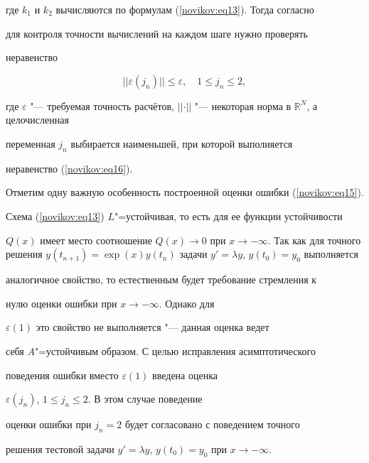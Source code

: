 где $k_1$ и $k_2$ вычисляются по формулам (\ref{novikov:eq13}). Тогда согласно \cite{Novikov:NovNov}

для контроля точности вычислений на каждом шаге нужно проверять

неравенство

\begin{equation}

\label{novikov:eq16}

\vert \vert \varepsilon(j_n)\vert \vert \leq \varepsilon,\quad 1\leq j_n \leq 2,

\end{equation}

где $\varepsilon $ "--- требуемая точность расчётов, $\vert \vert

\cdot \vert \vert $ "--- некоторая норма в $\mathbb{R}^N$, а целочисленная

переменная $j_n$ выбирается наименьшей, при которой выполняется

неравенство (\ref{novikov:eq16}).



Отметим одну важную особенность построенной оценки ошибки (\ref{novikov:eq15}).

Схема (\ref{novikov:eq13}) $L$"=устойчивая, то есть для ее функции устойчивости

$Q(x)$ имеет место соотношение $Q(x) \rightarrow 0$ при $x

\rightarrow - \infty $. Так как для точного решения $y(t_{n

+1})=\exp(x)y(t_n)$ задачи $y'=\lambda y$, $y(t_0)=y_0$ выполняется

аналогичное свойство, то естественным будет требование стремления к

нулю оценки ошибки при $x \rightarrow -\infty $. Однако для

$\varepsilon(1)$ это свойство не выполняется "--- данная оценка ведет

себя $A$"=устойчивым образом. С целью исправления асимптотического

поведения ошибки вместо $\varepsilon(1)$ введена оценка

$\varepsilon(j_n)$, $1 \le j_n \le 2$. В этом случае поведение

оценки ошибки при $j_n =2$ будет согласовано с поведением точного

решения тестовой задачи $y'=\lambda y$, $y(t_0)=y_0$ при $x \to

-\infty $.



